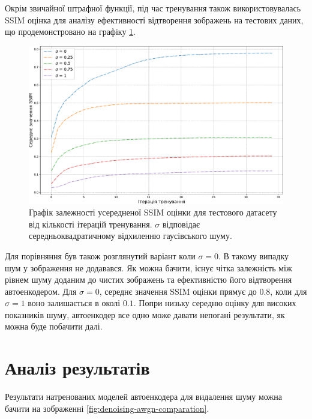 \documentclass[14pt,a4paper]{extarticle}
\newcounter{e}
\numberwithin{equation}{section}
\numberwithin{figure}{section}
\begin{document}
	Окрім звичайної штрафної функції, під час тренування також використовувалась SSIM оцінка для аналізу ефективності відтворення зображень на тестових даних, що продемонстровано на графіку \ref{fig:awgn-train-ssim-comparation}.
	
	\begin{figure}[H]
		\centering
		\includegraphics[width=1\textwidth]{../resources/awgn-train-ssim-comparation.pdf}
		\caption{Графік залежності усередненої SSIM оцінки для тестового датасету від кількості ітерацій тренування. $\sigma$ відповідає середньоквадратичному відхиленню гаусівського шуму.}
		\label{fig:awgn-train-ssim-comparation}
	\end{figure}
	
	Для порівняння був також розглянутий варіант коли $\sigma = 0$. В такому випадку шум у зображення не додавався. Як можна бачити, існує чітка залежність між рівнем шуму доданим до чистих зображень та ефективністю його відтворення автоенкодером. Для $\sigma = 0$, середнє значення SSIM оцінки прямує до 0.8, коли для $\sigma = 1$ воно залишається в околі $0.1$. Попри низьку середню оцінку для високих показників шуму, автоенкодер все одно може давати непогані результати, як можна буде побачити далі.
		
	\newpage
	\thispagestyle{empty}
	\section{Аналіз результатів}
	
	Результати натренованих моделей автоенкодера для видалення шуму можна бачити на зображенні \ref{fig:denoising-awgn-comparation}.
	
\end{document}
